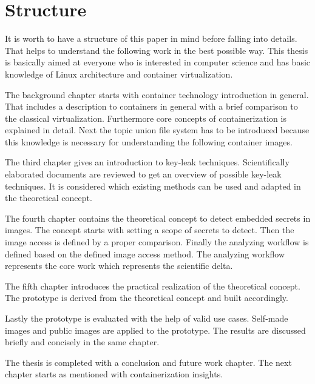 %
%
\section{Structure}
\label{sec:intro:structure}
It is worth to have a structure of this paper in mind before falling into details. 
That helps to understand the following work in the best possible way. 
This thesis is basically aimed at everyone who is interested in computer science and has basic knowledge of Linux architecture and container virtualization.

The background chapter starts with container technology introduction in general. 
That includes a description to containers in general with a brief comparison to the classical virtualization. 
Furthermore core concepts of containerization is explained in detail.
Next the topic union file system has to be introduced because this knowledge is necessary for understanding the following container images.

The third chapter gives an introduction to key-leak techniques.
Scientifically elaborated documents are reviewed to get an overview of possible key-leak techniques.
It is considered which existing methods can be used and adapted in the theoretical concept.

The fourth chapter contains the theoretical concept to detect embedded secrets in images. 
The concept starts with setting a scope of secrets to detect. Then the image access is defined by a proper comparison.
Finally the analyzing workflow is defined based on the defined image access method.
The analyzing workflow represents the core work which represents the scientific delta.

The fifth chapter introduces the practical realization of the theoretical concept. 
The prototype is derived from the theoretical concept and built accordingly.

Lastly the prototype is evaluated with the help of valid use cases. Self-made images and public images are applied to the prototype. 
The results are discussed briefly and concisely in the same chapter.

The thesis is completed with a conclusion and future work chapter.	
The next chapter starts as mentioned with containerization insights.
